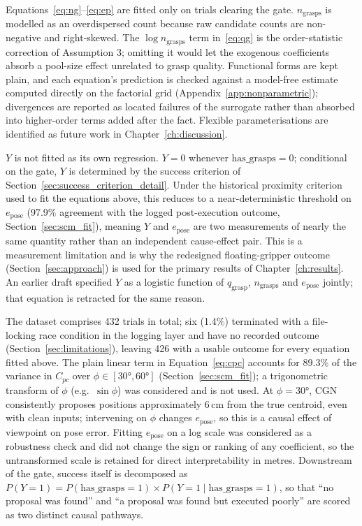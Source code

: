 \documentclass[11pt,a4paper]{report}
\begin{document}
Equations~\eqref{eq:ng}--\eqref{eq:ep} are fitted only on trials clearing the gate. $n_{\text{grasps}}$ is modelled as an overdispersed count because raw candidate counts are non-negative and right-skewed. The $\log n_{\text{grasps}}$ term in~\eqref{eq:qg} is the order-statistic correction of Assumption 3; omitting it would let the exogenous coefficients absorb a pool-size effect unrelated to grasp quality. Functional forms are kept plain, and each equation's prediction is checked against a model-free estimate computed directly on the factorial grid (Appendix~\ref{app:nonparametric}); divergences are reported as located failures of the surrogate rather than absorbed into higher-order terms added after the fact. Flexible parameterisations are identified as future work in Chapter~\ref{ch:discussion}.

$Y$ is not fitted as its own regression. $Y=0$ whenever $\text{has\_grasps}=0$; conditional on the gate, $Y$ is determined by the success criterion of Section~\ref{sec:success_criterion_detail}. Under the historical proximity criterion used to fit the equations above, this reduces to a near-deterministic threshold on $e_{\text{pose}}$ (97.9\% agreement with the logged post-execution outcome, Section~\ref{sec:scm_fit}), meaning $Y$ and $e_{\text{pose}}$ are two measurements of nearly the same quantity rather than an independent cause-effect pair. This is a measurement limitation and is why the redesigned floating-gripper outcome (Section~\ref{sec:approach}) is used for the primary results of Chapter~\ref{ch:results}. An earlier draft specified $Y$ as a logistic function of $q_{\text{grasp}}$, $n_{\text{grasps}}$ and $e_{\text{pose}}$ jointly; that equation is retracted for the same reason.

The dataset comprises 432 trials in total; six (1.4\%) terminated with a file-locking race condition in the logging layer and have no recorded outcome (Section~\ref{sec:limitations}), leaving 426 with a usable outcome for every equation fitted above. The plain linear term in Equation~\eqref{eq:cpc} accounts for 89.3\% of the variance in $C_{pc}$ over $\phi \in [30°, 60°]$ (Section~\ref{sec:scm_fit}); a trigonometric transform of $\phi$ (e.g.\ $\sin\phi$) was considered and is not used. At $\phi = 30°$, CGN consistently proposes positions approximately 6\,cm from the true centroid, even with clean inputs; intervening on $\phi$ changes $e_{\text{pose}}$, so this is a causal effect of viewpoint on pose error. Fitting $e_{\text{pose}}$ on a log scale was considered as a robustness check and did not change the sign or ranking of any coefficient, so the untransformed scale is retained for direct interpretability in metres. Downstream of the gate, success itself is decomposed as $P(Y{=}1) = P(\text{has\_grasps}{=}1) \times P(Y{=}1 \mid \text{has\_grasps}{=}1)$, so that ``no proposal was found'' and ``a proposal was found but executed poorly'' are scored as two distinct causal pathways. \label{sec:eq_gate}
\end{document}
